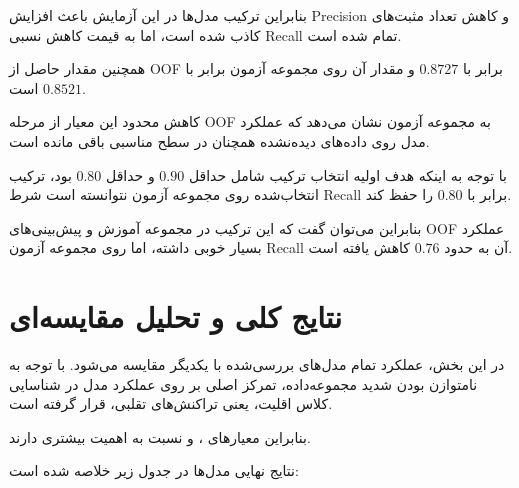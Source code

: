 \documentclass[10pt,a4paper,twocolumn]{article}
\begin{document}
بنابراین ترکیب مدل‌ها در این آزمایش باعث افزایش Precision
و کاهش تعداد مثبت‌های کاذب شده است، اما به قیمت کاهش نسبی
Recall تمام شده است.

همچنین مقدار  حاصل از OOF برابر با $0.8727$ و
مقدار آن روی مجموعه آزمون برابر با $0.8521$ است.

کاهش محدود این معیار از مرحله OOF به مجموعه آزمون نشان می‌دهد
که عملکرد مدل روی داده‌های دیده‌نشده همچنان در سطح مناسبی
باقی مانده است.

با توجه به اینکه هدف اولیه انتخاب ترکیب شامل
 حداقل $0.90$ و
 حداقل $0.80$ بود، ترکیب انتخاب‌شده روی مجموعه
آزمون نتوانسته است شرط Recall برابر با $0.80$ را حفظ کند.

بنابراین می‌توان گفت که این ترکیب در مجموعه آموزش و
پیش‌بینی‌های OOF عملکرد بسیار خوبی داشته، اما روی مجموعه
آزمون Recall آن به حدود $0.76$ کاهش یافته است.


\section{نتایج کلی و تحلیل مقایسه‌ای}

در این بخش، عملکرد تمام مدل‌های بررسی‌شده با یکدیگر مقایسه
می‌شود. با توجه به نامتوازن بودن شدید مجموعه‌داده، تمرکز اصلی
بر روی عملکرد مدل در شناسایی کلاس اقلیت، یعنی تراکنش‌های تقلبی،
قرار گرفته است.

بنابراین معیارهای ،
 و  نسبت به  اهمیت
بیشتری دارند.

نتایج نهایی مدل‌ها در جدول زیر خلاصه شده است:
\end{document}
